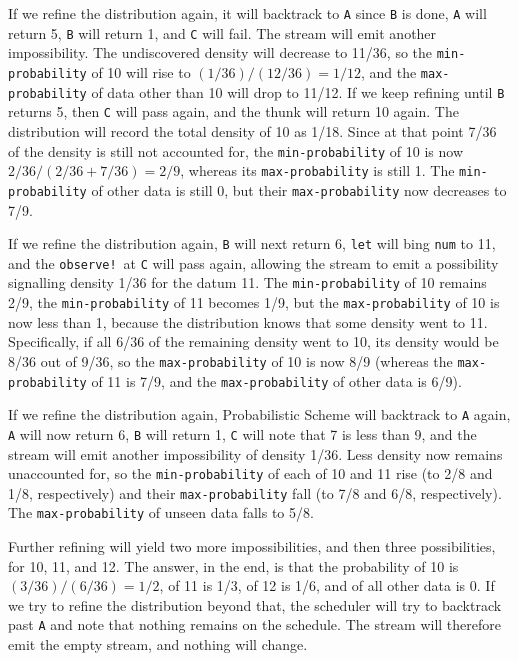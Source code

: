 \documentclass[10pt]{sigplanconf}
\newcommand{\code}[1]{\texttt{#1}}
\begin{document}
If we refine the distribution again, it will backtrack to \code{A}
since \code{B} is done, \code{A} will return 5, \code{B} will return
1, and \code{C} will fail.  The stream will emit another
impossibility.  The undiscovered density will decrease to 11/36, so
the \code{min-probability} of 10 will rise to $(1/36) / (12/36) = 1/12$,
and the \code{max-probability} of data other than 10 will drop to 11/12.
If we keep refining until \code{B} returns 5, then \code{C} will pass
again, and the thunk will return 10 again.  The distribution will
record the total density of 10 as 1/18.  Since at that point 7/36 of
the density is still not accounted for, the \code{min-probability} of
10 is now $2/36 / (2/36 + 7/36) = 2/9$, whereas its
\code{max-probability} is still 1.  The \code{min-probability} of
other data is still 0, but their \code{max-probability} now decreases
to 7/9.

If we refine the distribution again, \code{B} will next return 6,
\code{let} will bing \code{num} to 11, and the \code{observe!}\ at
\code{C} will pass again, allowing the stream to emit a possibility
signalling density 1/36 for the datum 11.  The \code{min-probability}
of 10 remains 2/9, the \code{min-probability} of 11 becomes 1/9, but
the \code{max-probability} of 10 is now less than 1, because the
distribution knows that some density went to 11.  Specifically, if all
6/36 of the remaining density went to 10, its density would be 8/36
out of 9/36, so the \code{max-probability} of 10 is now 8/9 (whereas the
\code{max-probability} of 11 is 7/9, and the \code{max-probability}
of other data is 6/9).

If we refine the distribution again, Probabilistic Scheme will
backtrack to \code{A} again, \code{A} will now return 6,
\code{B} will return 1, \code{C} will note that 7 is less than 9,
and the stream will emit another impossibility of density 1/36.
Less density now remains unaccounted for, so the \code{min-probability}
of each of 10 and 11 rise (to 2/8 and 1/8, respectively) and their 
\code{max-probability} fall (to 7/8 and 6/8, respectively).  The
\code{max-probability} of unseen data falls to 5/8.

Further refining will yield two more impossibilities, and then three
possibilities, for 10, 11, and 12.  The answer, in the end, is that
the probability of 10 is $(3/36) / (6/36) = 1/2$, of 11 is 1/3, of 12
is 1/6, and of all other data is 0.  If we try to refine the
distribution beyond that, the scheduler will try to backtrack past
\code{A} and note that nothing remains on the schedule.  The stream
will therefore emit the empty stream, and nothing will change.
\end{document}
